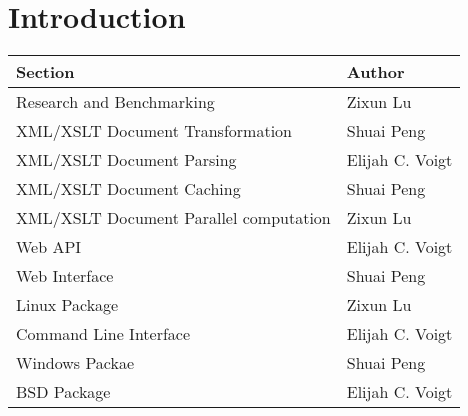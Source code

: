\section{Introduction}

\begin{center}
    \begin{tabular}{ | l | p{10cm} |}
    \hline
    Section & Author \\ \hline
    Research and Benchmarking & Zixun Lu \\ \hline
    XML/XSLT Document Transformation & Shuai Peng \\ \hline
    XML/XSLT Document Parsing & Elijah C. Voigt \\ \hline
    XML/XSLT Document Caching & Shuai Peng \\ \hline
    XML/XSLT Document Parallel computation & Zixun Lu \\ \hline
    Web API & Elijah C. Voigt\\ \hline
    Web Interface & Shuai Peng \\ \hline
    Linux Package & Zixun Lu \\ \hline
    Command Line Interface& Elijah C. Voigt \\ \hline
    Windows Packae & Shuai Peng \\ \hline
    BSD Package & Elijah C. Voigt \\ \hline
    \end{tabular}
\end{center}

\tableofcontents

\clearpage





\newpage

